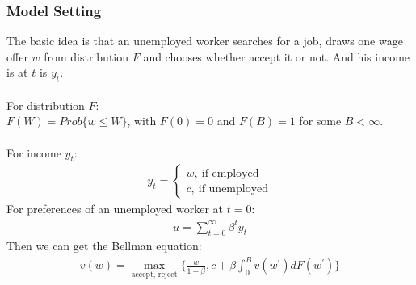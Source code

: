 \documentclass{article}
\begin{document}
\subsubsection{Model Setting}
The basic idea is that an unemployed worker searches for a job, draws one wage offer $w$ from distribution $F$ and chooses whether accept it or not. And his income is at $t$ is $y_t$.\\\\
For distribution $F$:\\
\indent $F(W) = Prob\{w \leq W\}$, with $F(0) = 0$ and $F(B) = 1$ for some $B < \infty$.\\\\
For income $y_t$:
\begin{align*}
	y_t = \left\{
				\begin{array}{lr}
					w,\ \text{if employed}\\
					c,\ \text{if unemployed}
				\end{array}
			\right.
\end{align*}
For preferences of an unemployed worker at $t = 0$:
\begin{align*}
	u = \sum\limits^\infty_{t=0} \beta^t y_t
\end{align*}
Then we can get the Bellman equation:
\begin{align*}
	v(w) = \mathop{max}\limits_{\text{accept, reject}} \{\frac{w}{1 - \beta}, c + \beta \int^B_0 v(w^\prime)dF(w^\prime)\}
\end{align*}
\end{document}
